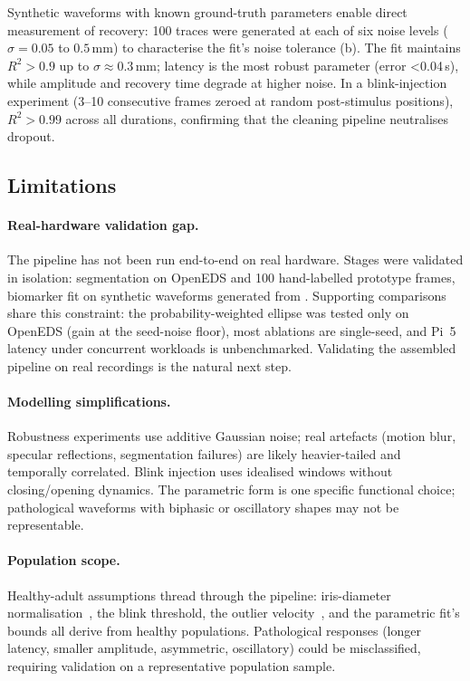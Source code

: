 Synthetic  waveforms with known ground-truth parameters enable direct measurement of recovery: 100 traces were generated at each of six noise levels ($\sigma = 0.05$ to $0.5$\,mm) to characterise the fit's noise tolerance (b). The fit maintains $R^2 > 0.9$ up to $\sigma \approx 0.3$\,mm; latency is the most robust parameter (error {<}0.04\,s), while amplitude and recovery time degrade at higher noise. In a blink-injection experiment (3--10 consecutive frames zeroed at random post-stimulus positions), $R^2 > 0.99$ across all durations, confirming that the cleaning pipeline neutralises dropout.


\subsection{Limitations}
\label{sec:limitations}

\paragraph{Real-hardware validation gap.} The pipeline has not been run end-to-end on real hardware. Stages were validated in isolation: segmentation on OpenEDS and 100 hand-labelled prototype frames, biomarker fit on synthetic waveforms generated from . Supporting comparisons share this constraint: the probability-weighted ellipse was tested only on OpenEDS (gain at the seed-noise floor), most ablations are single-seed, and Pi~5 latency under concurrent workloads is unbenchmarked. Validating the assembled pipeline on real recordings is the natural next step.

\paragraph{Modelling simplifications.} Robustness experiments use additive Gaussian noise; real artefacts (motion blur, specular reflections, segmentation failures) are likely heavier-tailed and temporally correlated. Blink injection uses idealised windows without closing/opening dynamics. The parametric  form is one specific functional choice; pathological waveforms with biphasic or oscillatory shapes may not be representable.

\paragraph{Population scope.} Healthy-adult assumptions thread through the pipeline: iris-diameter normalisation~\cite{boyle2021hvid}, the blink threshold, the outlier velocity~\cite{bremner2012pupillometric}, and the parametric fit's bounds all derive from healthy populations. Pathological responses (longer latency, smaller amplitude, asymmetric, oscillatory) could be misclassified, requiring validation on a representative population sample.
